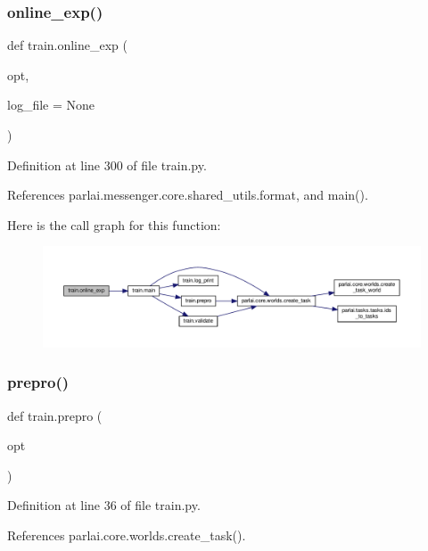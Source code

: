 \subsubsection{\texorpdfstring{online\+\_\+exp()}{online\_exp()}}
{\footnotesize\ttfamily def train.\+online\+\_\+exp (\begin{DoxyParamCaption}\item[{}]{opt,  }\item[{}]{log\+\_\+file = {\ttfamily None} }\end{DoxyParamCaption})}



Definition at line 300 of file train.\+py.



References parlai.\+messenger.\+core.\+shared\+\_\+utils.\+format, and main().

Here is the call graph for this function\+:
\nopagebreak
\begin{figure}[H]
\begin{center}
\leavevmode
\includegraphics[width=350pt]{namespacetrain_ae2ba29fb97dfcb37d81039ba8e7d8580_cgraph}
\end{center}
\end{figure}
\mbox{\label{namespacetrain_a69347e6c50429f5076c376b70b1d8a27}} 
\subsubsection{\texorpdfstring{prepro()}{prepro()}}
{\footnotesize\ttfamily def train.\+prepro (\begin{DoxyParamCaption}\item[{}]{opt }\end{DoxyParamCaption})}



Definition at line 36 of file train.\+py.



References parlai.\+core.\+worlds.\+create\+\_\+task().



